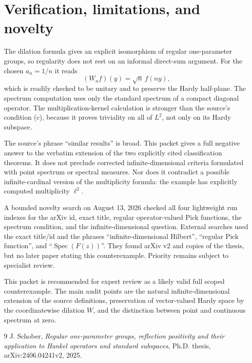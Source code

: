 \documentclass[11pt]{article}
\begin{document}
\section{Verification, limitations, and novelty}

The dilation formula gives an explicit isomorphism of regular
one-parameter groups, so regularity does not rest on an informal direct-sum
argument.  For the chosen $a_n=1/n$ it reads
\[
  (W_nf)(y)=\sqrt n\,f(ny),
\]
which is readily checked to be unitary and to preserve the Hardy half-plane.
The spectrum computation uses only the standard spectrum of a compact
diagonal operator.  The multiplication-kernel calculation is stronger than
the source's condition (c), because it proves triviality on all of $L^2$, not
only on its Hardy subspace.

The source's phrase ``similar results'' is broad.  This packet gives a full
negative answer to the verbatim extension of the two explicitly cited
classification theorems.  It does not preclude corrected infinite-dimensional
criteria formulated with point spectrum or spectral measures.  Nor does it
contradict a possible infinite-cardinal version of the multiplicity formula:
the example has explicitly computed multiplicity $\ell^2$.

A bounded novelty search on August 13, 2026 checked all four lightweight run
indexes for the arXiv id, exact title, regular operator-valued Pick functions,
the spectrum condition, and the infinite-dimensional question.  External
searches used the exact title/id and the phrases ``infinite-dimensional
Hilbert'', ``regular Pick function'', and ``$\operatorname{Spec}(F(z))$''.
They found arXiv v2 and copies of the thesis, but no later paper stating this
counterexample.  Priority remains subject to specialist review.

This packet is recommended for expert review as a likely valid full scoped
counterexample.  The main audit points are the natural infinite-dimensional
extension of the source definitions, preservation of vector-valued Hardy
space by the coordinatewise dilation $W$, and the distinction between point
and continuous spectrum at zero.

\begin{thebibliography}{9}
J. Schober,
\emph{Regular one-parameter groups, reflection positivity and their
application to Hankel operators and standard subspaces},
Ph.D. thesis, arXiv:2406.04241v2, 2025.
\end{thebibliography}
\end{document}
